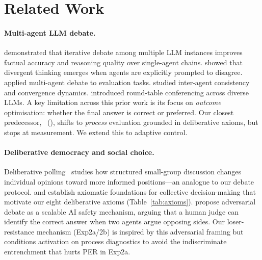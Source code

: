 \section{Related Work}
\label{sec:related}

\paragraph{Multi-agent LLM debate.}
\citet{du2023improving} demonstrated that iterative debate among multiple
LLM instances improves factual accuracy and reasoning quality over
single-agent chains.
\citet{liang2023encouraging} showed that divergent thinking emerges when
agents are explicitly prompted to disagree.
\citet{chan2023chateval} applied multi-agent debate to evaluation tasks.
\citet{xiong2023examining} studied inter-agent consistency and convergence
dynamics.
\citet{chen2024reconcile} introduced round-table conferencing across diverse
LLMs.
A key limitation across this prior work is its focus on \emph{outcome}
optimisation: whether the final answer is correct or preferred.
Our closest predecessor, \citeauthor{diagnostic2026}~(\citeyear{diagnostic2026}),
shifts to \emph{process} evaluation grounded in deliberative axioms, but
stops at measurement.
We extend this to adaptive control.

\paragraph{Deliberative democracy and social choice.}
Deliberative polling~\cite{fishkin2009deliberation} studies how structured
small-group discussion changes individual opinions toward more informed
positions—an analogue to our debate protocol.
\citet{arrow1950difficulty} and \citet{sen1970collective} establish axiomatic
foundations for collective decision-making that motivate our eight deliberative
axioms (Table~\ref{tab:axioms}).
\citet{irving2018ai} propose adversarial debate as a scalable AI safety
mechanism, arguing that a human judge can identify the correct answer when
two agents argue opposing sides.
Our loser-resistance mechanism (Exp2a/2b) is inspired by this adversarial
framing but conditions activation on process diagnostics to avoid the
indiscriminate entrenchment that hurts PER in Exp2a.

